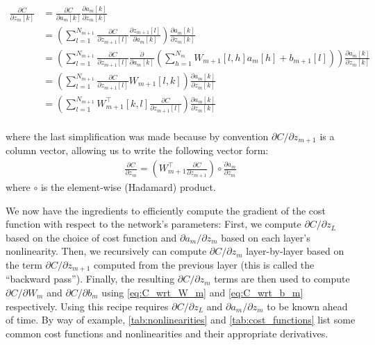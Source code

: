 \begin{align}
        \frac{\partial C}{\partial z_m[k]} &= \frac{\partial C}{\partial a_m[k]} \frac{\partial a_m[k]}{\partial z_m[k]}\\
                                           &= \left(\sum_{l = 1}^{N_{m + 1}}\frac{\partial C}{\partial z_{m + 1}[l]}\frac{\partial z_{m + 1}[l]}{\partial a_m[k]}\right)\frac{\partial a_m[k]}{\partial z_m[k]}\\
                                           &= \left(\sum_{l = 1}^{N_{m + 1}}\frac{\partial C}{\partial z_{m + 1}[l]}\frac{\partial}{\partial a_m[k]} \left(\sum_{h = 1}^{N_m} W_{m + 1}[l, h] a_m[h] + b_{m + 1}[l]\right)\right) \frac{\partial a_m[k]}{\partial z_m[k]}\\
                                           &= \left(\sum_{l = 1}^{N_{m + 1}}\frac{\partial C}{\partial z_{m + 1}[l]} W_{m + 1}[l, k]\right) \frac{\partial a_m[k]}{\partial z_m[k]}\\
                                           &= \left(\sum_{l = 1}^{N_{m + 1}}W_{m + 1}^\top[k, l] \frac{\partial C}{\partial z_{m + 1}[l]}\right) \frac{\partial a_m[k]}{\partial z_m[k]}\\
\end{align}

where the last simplification was made because by convention $\partial C/\partial z_{m + 1}$ is a column vector, allowing us to write the following vector form:
\begin{align}
\frac{\partial C}{\partial z_m} = \left(W_{m + 1}^\top \frac{\partial C}{\partial z_{m + 1}}\right) \circ \frac{\partial a_m}{\partial z_m}
\label{eq:C_wrt_z_m}
\end{align}
where $\circ$ is the element-wise (Hadamard) product.

We now have the ingredients to efficiently compute the gradient of the cost function with respect to the network's parameters: First, we compute $\partial C/\partial z_L$ based on the choice of cost function and $\partial a_m/\partial z_m$ based on each layer's nonlinearity.
Then, we recursively can compute $\partial C/\partial z_m$ layer-by-layer based on the term $\partial C/\partial z_{m + 1}$ computed from the previous layer (this is called the ``backward pass'').
Finally, the resulting $\partial C/\partial z_m$ terms are then used to compute $\partial C/\partial W_m$ and $\partial C/\partial b_m$ using \cref{eq:C_wrt_W_m} and \cref{eq:C_wrt_b_m} respectively.
Using this recipe requires $\partial C/\partial z_L$ and $\partial a_m/\partial z_m$ to be known ahead of time.
By way of example, \cref{tab:nonlinearities} and \cref{tab:cost_functions} list some common cost functions and nonlinearities and their appropriate derivatives.


